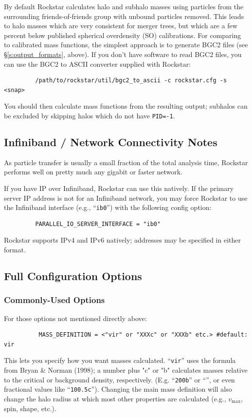 \documentclass[12pt]{article}
\begin{document}
      By default Rockstar calculates halo and subhalo masses using particles from the surrounding friends-of-friends group with unbound particles removed.  This leads to halo masses which are very consistent for merger trees, but which are a few percent below published spherical overdensity (SO) calibrations.  For comparing to calibrated mass functions, the simplest approach is to generate BGC2 files (see \S \ref{s:output_formats}, above).  If you don't have software to read BGC2 files, you can use the BGC2 to ASCII converter supplied with Rockstar:
\begin{verbatim}
         /path/to/rockstar/util/bgc2_to_ascii -c rockstar.cfg -s <snap>
\end{verbatim}
You should then calculate mass functions from the resulting output; subhalos can be excluded by skipping halos which do not have \texttt{PID=-1}.


\subsection{Infiniband / Network Connectivity Notes}
      As particle transfer is usually a small fraction of the total analysis
      time, Rockstar performs well on pretty much any gigabit or faster network.

      If you have IP over Infiniband, Rockstar can use this natively.  If the primary
      server IP address is not for an Infiniband network, you may force Rockstar to use the
      Infiniband interface (e.g., ``\texttt{ib0}'') with the following config option:
\begin{verbatim}
         PARALLEL_IO_SERVER_INTERFACE = "ib0"
\end{verbatim}
      Rockstar supports IPv4 and IPv6 natively; addresses may be specified
      in either format.



\subsection{Full Configuration Options}
\label{s:full_options}

\subsubsection{Commonly-Used Options}
\label{s:common_options}
      For those options not mentioned directly above:
\begin{verbatim}
      	  MASS_DEFINITION = <"vir" or "XXXc" or "XXXb" etc.> #default: vir
\end{verbatim}
      This lets you specify how you want masses calculated.  ``\texttt{vir}'' uses the
      formula from Bryan \& Norman (1998); a number plus "c" or "b" calculates
      masses relative to the critical or background density, respectively.
      (E.g. ``\texttt{200b}'' or ``'', or even fractional values like ``\texttt{100.5c}'').
      Changing the main mass definition will also change the halo radius at which most other
      properties are calculated (e.g., $v_\mathrm{max}$, spin, shape, etc.).
      
\end{document}

